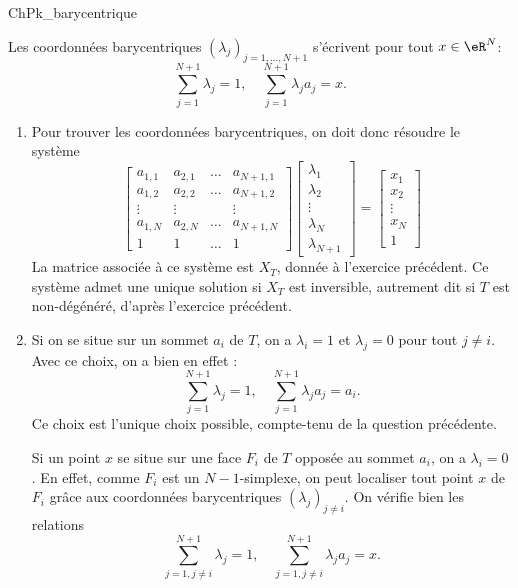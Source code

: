 \begin{corrige}{ChPk_barycentrique}

Les coordonnées barycentriques $(\lambda_j)_{j=1,\ldots,N+1}$ s'écrivent pour tout $x\in\eR^N$:
\[
\sum_{j=1}^{N+1} \lambda_j = 1, \quad
\sum_{j=1}^{N+1} \lambda_j a_j = x.
\]

\begin{enumerate}

\item Pour trouver les coordonnées barycentriques, on doit donc résoudre le système 
\[
\left [
\begin{array}{cccc}
a_{1,1} & a_{2,1} & \ldots & a_{N+1,1} \\
a_{1,2} & a_{2,2} & \ldots & a_{N+1,2} \\
\vdots & \vdots & & \vdots \\
a_{1,N} & a_{2,N} & \ldots & a_{N+1,N} \\
1 & 1 & \ldots & 1
\end{array}
\right ]
\left [
\begin{array}{c}
\lambda_1 \\
\lambda_2 \\
\vdots  \\
\lambda_N \\
\lambda_{N+1}
\end{array}
\right ]
=
\left [
\begin{array}{c}
x_1 \\
x_2 \\
\vdots  \\
x_N \\
1
\end{array}
\right ]
\]
La matrice associée à ce système est $X_T$, donnée à l'exercice précédent.
Ce système admet une unique solution si $X_T$ est inversible, autrement dit si $T$ est non-dégénéré, d'après l'exercice précédent.

\item Si on se situe sur un sommet $a_i$ de $T$, on a $\lambda_i = 1$ et $\lambda_j = 0$ pour tout $j \neq i$. Avec ce choix, on a bien en effet :
\[
\sum_{j=1}^{N+1} \lambda_j = 1, \quad
\sum_{j=1}^{N+1} \lambda_j a_j = a_i.
\]
Ce choix est l'unique choix possible, compte-tenu de la question précédente.

\medskip

Si un point $x$ se situe sur une face $F_i$ de $T$ opposée au sommet $a_i$, on a $\lambda_i = 0$. En effet, comme $F_i$ est un $N-1$-simplexe, on peut localiser tout point $x$ de $F_i$ grâce aux coordonnées barycentriques $(\lambda_j)_{j \neq i}$. On vérifie bien les relations
\[
\sum_{j=1 , j\neq i}^{N+1} \lambda_j = 1, \quad
\sum_{j=1 , j\neq i}^{N+1} \lambda_j a_j = x.
\]


\end{enumerate}
\end{corrige}
